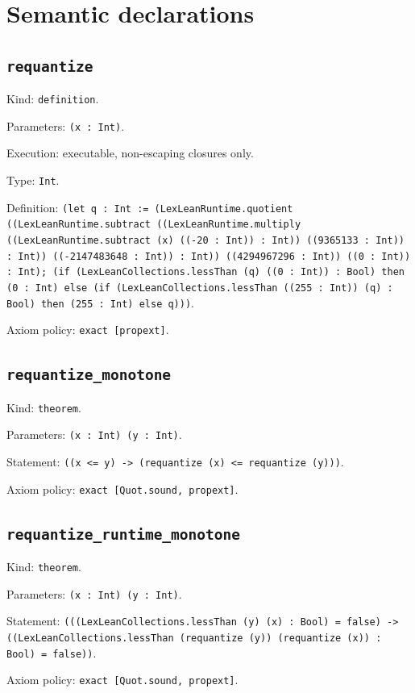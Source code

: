 \documentclass[11pt]{article}
\begin{document}
\section*{Semantic declarations}
\subsection*{\texttt{requantize}}
\noindent Kind: \texttt{definition}.\par
\noindent Parameters: \texttt{(x : Int)}.\par
\noindent Execution: executable, non-escaping closures only.\par
\noindent Type: \texttt{Int}.\par
\noindent Definition: \texttt{(let q : Int := (LexLeanRuntime.quotient ((LexLeanRuntime.subtract ((LexLeanRuntime.multiply ((LexLeanRuntime.subtract (x) ((-20 : Int)) : Int)) ((9365133 : Int)) : Int)) ((-2147483648 : Int)) : Int)) ((4294967296 : Int)) ((0 : Int)) : Int); (if (LexLeanCollections.lessThan (q) ((0 : Int)) : Bool) then (0 : Int) else (if (LexLeanCollections.lessThan ((255 : Int)) (q) : Bool) then (255 : Int) else q)))}.\par
\noindent Axiom policy: \texttt{exact [propext]}.\par
\subsection*{\texttt{requantize\_monotone}}
\noindent Kind: \texttt{theorem}.\par
\noindent Parameters: \texttt{(x : Int) (y : Int)}.\par
\noindent Statement: \texttt{((x <= y) -> (requantize (x) <= requantize (y)))}.\par
\noindent Axiom policy: \texttt{exact [Quot.sound, propext]}.\par
\subsection*{\texttt{requantize\_runtime\_monotone}}
\noindent Kind: \texttt{theorem}.\par
\noindent Parameters: \texttt{(x : Int) (y : Int)}.\par
\noindent Statement: \texttt{(((LexLeanCollections.lessThan (y) (x) : Bool) = false) -> ((LexLeanCollections.lessThan (requantize (y)) (requantize (x)) : Bool) = false))}.\par
\noindent Axiom policy: \texttt{exact [Quot.sound, propext]}.\par
\end{document}
